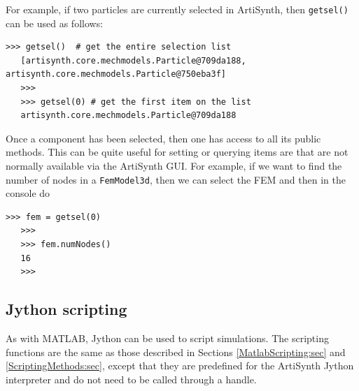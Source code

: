 \documentclass{article}
\begin{document}
For example, if two particles are currently selected in ArtiSynth, then
{\tt getsel()} can be used as follows:
%
\begin{lstlisting}[]
   >>> getsel()  # get the entire selection list
   [artisynth.core.mechmodels.Particle@709da188, artisynth.core.mechmodels.Particle@750eba3f]
   >>>
   >>> getsel(0) # get the first item on the list
   artisynth.core.mechmodels.Particle@709da188
\end{lstlisting}
%
Once a component has been selected, then one has access to all its
public methods. This can be quite useful for setting or querying
items are that are not normally available via the ArtiSynth GUI. For
example, if we want to find the number of nodes in a {\tt FemModel3d},
then we can select the FEM and then in the console do
%
\begin{lstlisting}[]
   >>> fem = getsel(0)
   >>>
   >>> fem.numNodes()
   16
   >>>
\end{lstlisting}
%

\subsection{Jython scripting}
\label{JythonScripting:sec}

As with MATLAB, Jython can be used to script simulations. The
scripting functions are the same as those described in Sections
\ref{MatlabScripting:sec} and \ref{ScriptingMethods:sec}, except that
they are predefined for the ArtiSynth Jython interpreter and
do not need to be called through a handle.
\end{document}
